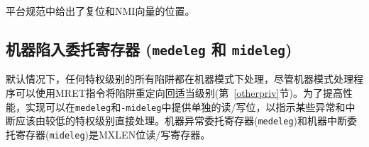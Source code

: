 \iffalse
\begin{commentary}
Reset and NMI vector locations are given in a platform specification.
\end{commentary}
\fi

\begin{commentary}
平台规范中给出了复位和NMI向量的位置。
\end{commentary}

\subsection{机器陷入委托寄存器 ({\tt medeleg} 和 {\tt mideleg})}

\iffalse
By default, all traps at any privilege level are handled in machine
mode, though a machine-mode handler can redirect traps back to the
appropriate level with the MRET instruction (Section~\ref{otherpriv}).
To increase performance, implementations can provide individual
read/write bits within {\tt medeleg} and {\tt mideleg} to indicate
that certain exceptions and interrupts should be processed directly by
a lower privilege level.  The machine exception delegation register
({\tt medeleg}) and machine interrupt delegation register ({\tt
  mideleg}) are MXLEN-bit read/write registers.

In systems with S-mode, the {\tt medeleg} and {\tt mideleg} registers
must exist, and setting a bit in
{\tt medeleg} or {\tt mideleg} will delegate the corresponding trap, when
occurring in S-mode or U-mode, to the S-mode trap handler.
In systems without S-mode, the {\tt medeleg} and {\tt mideleg} registers
should not exist.
\fi

默认情况下，任何特权级别的所有陷阱都在机器模式下处理，尽管机器模式处理程序可以使用MRET指令将陷阱重定向回适当级别(第~\ref{otherpriv}节)。为了提高性能，实现可以在{\tt medeleg}和{\tt-mideleg}中提供单独的读/写位，以指示某些异常和中断应该由较低的特权级别直接处理。机器异常委托寄存器({\tt medeleg})和机器中断委托寄存器({\tt mideleg})是MXLEN位读/写寄存器。

\iffalse
\begin{commentary}
  In versions 1.9.1 and earlier , these registers existed but were
  hardwired to zero in M-mode only, or M/U without N systems.  There
  is no reason to require they return zero in those cases, as the {\tt
    misa} register indicates whether they exist.
\end{commentary}
\fi

